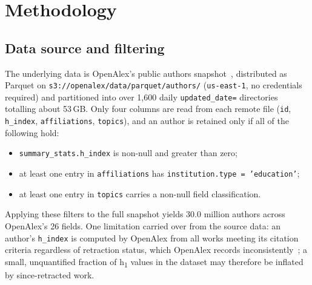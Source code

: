 \section{Methodology}
\label{sec:methodology}

\subsection{Data source and filtering}
The underlying data is OpenAlex's public authors snapshot~\citep{openalex}, distributed as Parquet on \texttt{s3://openalex/data/parquet/authors/} (\texttt{us-east-1}, no credentials required) and partitioned into over 1,600 daily \texttt{updated\_date=} directories totalling about 53\,GB. Only four columns are read from each remote file (\texttt{id}, \texttt{h\_index}, \texttt{affiliations}, \texttt{topics}), and an author is retained only if all of the following hold:
\begin{itemize}
	\item \texttt{summary\_stats.h\_index} is non-null and greater than zero;
	\item at least one entry in \texttt{affiliations} has \texttt{institution.type = 'education'};
	\item at least one entry in \texttt{topics} carries a non-null field classification.
\end{itemize}
Applying these filters to the full snapshot yields 30.0 million authors across OpenAlex's 26 fields. One limitation carried over from the source data: an author's \texttt{h\_index} is computed by OpenAlex from all works meeting its citation criteria regardless of retraction status, which OpenAlex records inconsistently~\citep{hauschke2025}; a small, unquantified fraction of h\textsubscript{1} values in the dataset may therefore be inflated by since-retracted work.

